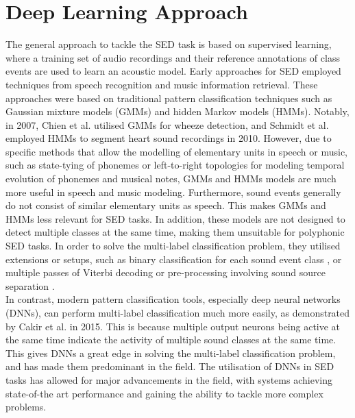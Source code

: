 \section{Deep Learning Approach}
The general approach to tackle the SED task is based on supervised learning, where a training set of audio recordings and their reference annotations of class events are used to learn an acoustic model. Early approaches for SED employed techniques from speech recognition and music information retrieval. These approaches were based on traditional pattern classification techniques such as Gaussian mixture models (GMMs) and hidden Markov models (HMMs). Notably, in 2007, Chien et al. \cite{Chien_2007} utilised GMMs for wheeze detection, and Schmidt et al. \cite{Schmidt_2010} employed HMMs to segment heart sound recordings in 2010. However, due to specific methods that allow the modelling of elementary units in speech or music, such as state-tying of phonemes or left-to-right topologies for modeling temporal evolution of phonemes and musical notes, GMMs and HMMs models are much more useful in speech and music modeling. Furthermore, sound events generally do not consist of similar elementary units as speech. This makes GMMs and HMMs less relevant for SED tasks. In addition, these models are not designed to detect multiple classes at the same time, making them unsuitable for polyphonic SED tasks. In order to solve the multi-label classification problem, they utilised extensions or setups, such as binary classification for each sound event class \cite{Mesaros2016TUTDF}, or multiple passes of Viterbi decoding \cite{heittola-2013} or pre-processing involving sound source separation \cite{heittola-2011}.\\ 

In contrast, modern pattern classification tools, especially deep neural networks (DNNs), can perform multi-label classification much more easily, as demonstrated by Cakir et al. \cite{Cakir_2015} in 2015. This is because multiple output neurons being active at the same time indicate the activity of multiple sound classes at the same time. This gives DNNs a great edge in solving the multi-label classification problem, and has made them predominant in the field. The utilisation of DNNs in SED tasks has allowed for major advancements in the field, with systems achieving state-of-the art performance and gaining the ability to tackle more complex problems.

